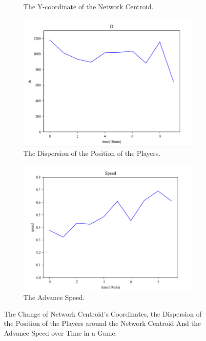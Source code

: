 \documentclass{mcmthesis}
\begin{document}
\begin{figure}[h]
\begin{subfigure}[b]{0.5\textwidth}
			\caption{The Y-coordinate of the Network Centroid.}
			\label{fig:y1}
		\end{subfigure}
		\begin{subfigure}[b]{0.5\textwidth}
			\includegraphics[width=\textwidth]{figures/d1.png}
			\caption{The Dispersion of the Position of the Players.}
			\label{fig:d1}
		\end{subfigure}%
		\begin{subfigure}[b]{0.5\textwidth}
			\includegraphics[width=\textwidth]{figures/s1.png}
			\caption{The Advance Speed.}
			\label{fig:s1}
		\end{subfigure}
		\caption{The Change of Network Centroid's Coordinates, the Dispersion of the Position of the Players around the Network Centroid And the Advance Speed over Time in a Game.}\label{fig:game}
	\end{figure}
\end{document}
